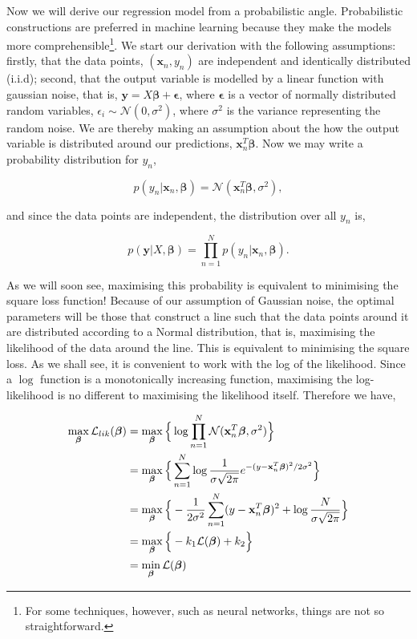 \documentclass[11pt]{amsart}
\begin{document}
Now we will derive our regression model from a probabilistic angle. Probabilistic constructions are preferred in machine learning because they make the models more comprehensible\footnote{For some techniques, however, such as neural networks, things are not so straightforward.}. We start our derivation with the following assumptions: firstly, that the data points, $(\mathbf{x}_n, y_n)$ are independent and identically distributed (i.i.d); second, that the output variable is modelled by a linear function with gaussian noise, that is, $\mathbf{y} = X\boldsymbol\beta + \boldsymbol\epsilon$, where $\boldsymbol\epsilon$ is a vector of normally distributed random variables, $\epsilon_i \sim \mathcal{N}(0, \sigma^2)$, where $\sigma^2$ is the variance representing the random noise. We are thereby making an assumption about the how the output variable is distributed around our predictions, $\mathbf{x}_n^T\boldsymbol\beta$. Now we may write a probability distribution for $y_n$,

$$p(y_n|\mathbf{x}_n, \boldsymbol\beta) = \mathcal{N}(\mathbf{x}_n^T\boldsymbol\beta, \sigma^2),$$

and since the data points are independent, the distribution over all $y_n$ is,

$$p(\mathbf{y}|X, \boldsymbol\beta) = \prod_{n=1}^N p(y_n|\mathbf{x}_n, \boldsymbol\beta).$$

As we will soon see, maximising this probability is equivalent to minimising the square loss function! Because of our assumption of Gaussian noise, the optimal parameters will be those that construct a line such that the data points around it are distributed according to a Normal distribution, that is, maximising the likelihood of the data around the line. This is equivalent to minimising the square loss. As we shall see, it is convenient to work with the log of the likelihood. Since a $\log$ function is a monotonically increasing function, maximising the log-likelihood is no different to maximising the likelihood itself. Therefore we have,

\begin{align}
\max_{\boldsymbol\beta}\mathcal{L}_{lik}(\boldsymbol\beta) &= \max_{\boldsymbol\beta}\Big\{\log \prod_{n=1}^N \mathcal{N}(\mathbf{x}_n^T\boldsymbol\beta, \sigma^2)\Big\} \notag \\
&=\max_{\boldsymbol\beta}\Big\{\sum_{n=1}^N \log \frac{1}{\sigma\sqrt{2\pi}}e^{-(y - \mathbf{x}_n^T\boldsymbol\beta)^2/2\sigma^2}\Big\} \notag \\
&=\max_{\boldsymbol\beta}\Big\{-\frac{1}{2\sigma^2}\sum_{n=1}^N (y - \mathbf{x}_n^T\boldsymbol\beta)^2 + \log\frac{N}{\sigma\sqrt{2\pi}}\Big\} \notag \\
&=\max_{\boldsymbol\beta}\Big\{-k_1\mathcal{L}(\boldsymbol\beta) + k_2\Big\} \notag \\
&=\min_{\boldsymbol\beta}\mathcal{L}(\boldsymbol\beta)\notag
\end{align}
\end{document}
